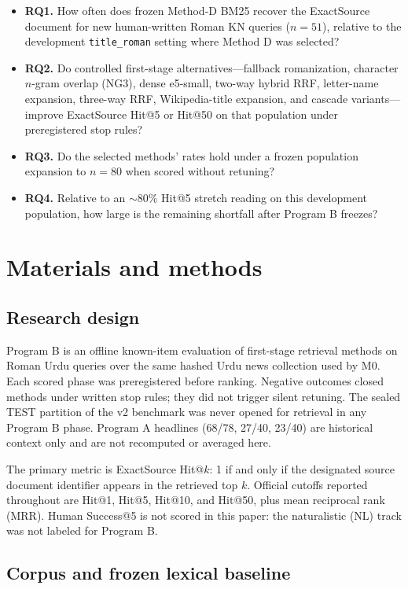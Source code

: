 \documentclass[10pt,letterpaper]{article}
\begin{document}
\begin{itemize}
\item \textbf{RQ1.} How often does frozen Method-D BM25 recover the ExactSource document for new human-written Roman KN queries ($n = 51$), relative to the development \texttt{title\_roman} setting where Method D was selected?
\item \textbf{RQ2.} Do controlled first-stage alternatives---fallback romanization, character $n$-gram overlap (NG3), dense e5-small, two-way hybrid RRF, letter-name expansion, three-way RRF, Wikipedia-title expansion, and cascade variants---improve ExactSource Hit@5 or Hit@50 on that population under preregistered stop rules?
\item \textbf{RQ3.} Do the selected methods' rates hold under a frozen population expansion to $n = 80$ when scored without retuning?
\item \textbf{RQ4.} Relative to an $\sim$80\% Hit@5 stretch reading on this development population, how large is the remaining shortfall after Program B freezes?
\end{itemize}

\section*{Materials and methods}
\subsection*{Research design}

Program B is an offline known-item evaluation of first-stage retrieval methods on Roman Urdu queries over the same hashed Urdu news collection used by M0. Each scored phase was preregistered before ranking. Negative outcomes closed methods under written stop rules; they did not trigger silent retuning. The sealed TEST partition of the v2 benchmark was never opened for retrieval in any Program B phase. Program A headlines (68/78, 27/40, 23/40) are historical context only and are not recomputed or averaged here.

The primary metric is ExactSource Hit@$k$: 1 if and only if the designated source document identifier appears in the retrieved top $k$. Official cutoffs reported throughout are Hit@1, Hit@5, Hit@10, and Hit@50, plus mean reciprocal rank (MRR). Human Success@5 is not scored in this paper: the naturalistic (NL) track was not labeled for Program B.

\subsection*{Corpus and frozen lexical baseline}
\end{document}
